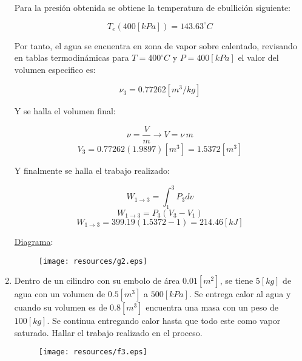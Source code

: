 \documentclass[letter,11pt]{article}
\begin{document}
\begin{enumerate}
Para la presión obtenida se obtiene la temperatura de ebullición siguiente:

\begin{equation*}
    T_{e}(400[kPa])=143.63^\circ C
\end{equation*}

Por tanto, el agua se encuentra en zona de vapor sobre calentado, revisando en
tablas termodinámicas para $T=400^\circ C$ y $P=400[kPa]$ el valor del
volumen especifico es:

\begin{equation*}
    \nu_3=0.77262[m^3/kg]
\end{equation*}

Y se halla el volumen final:

\begin{equation*}
    \nu=\frac{V}{m}\rightarrow
    V=\nu\,m
\end{equation*}
\begin{equation*}
    V_3=0.77262(1.9897)[m^3]=1.5372[m^3]
\end{equation*}

Y finalmente se halla el trabajo realizado:

\begin{equation*}
    W_{1\rightarrow 3}=\int_1^3 P_3 dv
\end{equation*}
\begin{equation*}
    W_{1\rightarrow 3}=P_3(V_3-V_1)
\end{equation*}
\begin{equation*}
    W_{1\rightarrow 3}=399.19(1.5372-1)=214.46[kJ]
\end{equation*}

\underline{Diagrama}:\\

\begin{figure}[!h]
\centering
\texttt{[image: resources/g2.eps]}
\end{figure}

\newpage

\item Dentro de un cilindro con su embolo de área $0.01[m^2]$, se tiene $5[kg]$
de agua con un volumen de $0.5[m^3]$ a $500[kPa]$. Se entrega calor al agua y
cuando su volumen es de $0.8[m^3]$ encuentra una masa con un peso de $100[kg]$.
Se continua entregando calor hasta que todo este como vapor saturado. Hallar el
trabajo realizado en el proceso.

\begin{figure}[!h]
\centering
\texttt{[image: resources/f3.eps]}
\end{figure}


\end{enumerate}
\end{document}
